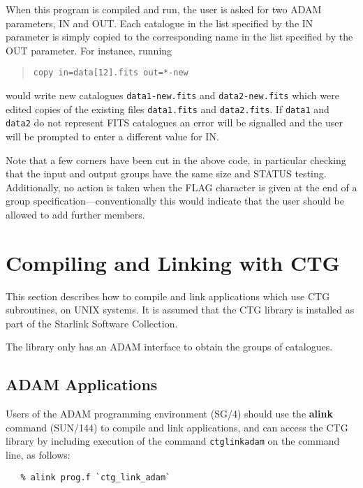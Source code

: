 \documentclass[twoside,11pt]{article}
\newcommand{\latex}[1]{#1}
\newcommand{\xref}[3]{#1}
\renewcommand{\_}{\texttt{\symbol{95}}}
\begin{document}
When this program is compiled and run, the user is asked for 
two ADAM parameters, IN and OUT.  Each catalogue in the list specified
by the IN parameter is simply copied to the corresponding name in the 
list specified by the OUT parameter.  For instance, running
\begin{quote}
\latexonly{\small}
\begin{verbatim}
copy in=data[12].fits out=*-new
\end{verbatim}
\end{quote}
would write new catalogues {\tt data1-new.fits} and {\tt data2-new.fits}
which were edited copies of the existing files {\tt data1.fits} and
{\tt data2.fits}.
If {\tt data1} and {\tt data2} do not represent FITS catalogues
an error will be signalled and the user will be prompted to enter
a different value for IN.

Note that a few corners have been cut in the above code, in particular
checking that the input and output groups have the same size and
STATUS testing.  Additionally, no action is taken when the FLAG
character is given at the end of a group 
specification---conventionally this would indicate that the user
should be allowed to add further members.

\section {Compiling and Linking with CTG}

This section describes how to compile and link applications which use
CTG subroutines, on UNIX systems. It is assumed that the CTG library
is installed as part of the Starlink Software Collection.

The library only has an ADAM interface to obtain the groups of
catalogues.

\subsection{\label{ss:buildingadamapplications}ADAM Applications}
Users of the \xref{ADAM}{sg4}{} programming environment
\latex{(SG/4)} should use
the \xref{{\bf alink}}{sun144}{ADAM_link_scripts} command
(\xref{SUN/144}{sun144}{}) to compile and link applications, and can
access the CTG\_ library by including execution of the command
{\tt ctg\_link\_adam} on the command line, as follows:

\small
\begin{verbatim}
   % alink prog.f `ctg_link_adam`
\end{verbatim}
\normalsize
\end{document}
